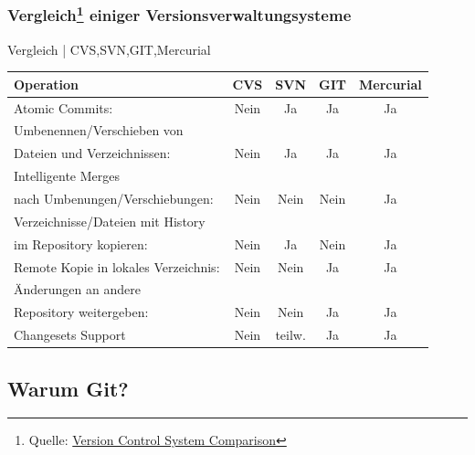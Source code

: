 \documentclass{beamer}
\begin{document}
\begin{frame}\frametitle{Vergleich\footnote{Quelle: \href{http://better-scm.shlomifish.org/comparison/comparison.html}{Version Control System Comparison}} einiger Versionsverwaltungsysteme }
\begin{exampleblock}{Vergleich | CVS,SVN,GIT,Mercurial}
	\begin{tabular}{l|c c c c}
	\hline
		\textbf{Operation} & \textbf{CVS} & \textbf{SVN} & \textbf{GIT} & \textbf{Mercurial} \\
	\hline
	\hline
		Atomic Commits: & Nein & Ja & Ja & Ja \\
	\hline
		Umbenennen/Verschieben von\\
		Dateien und Verzeichnissen: & Nein & Ja & Ja & Ja \\
	\hline
		Intelligente Merges \\ 
		nach Umbenungen/Verschiebungen: & Nein & Nein & Nein & Ja \\
	\hline
		Verzeichnisse/Dateien mit History \\
		im Repository kopieren: & Nein & Ja & Nein & Ja \\
	\hline		
		Remote Kopie in lokales Verzeichnis: & Nein & Nein & Ja & Ja \\
	\hline		
		Änderungen an andere \\
		Repository weitergeben: & Nein & Nein & Ja & Ja \\		
	\hline		
		Changesets Support & Nein & teilw. & Ja & Ja \\ 		
	\hline
	\hline
\end{tabular} 
\end{exampleblock}
\end{frame}

\subsection{Warum Git?}
\end{document}
